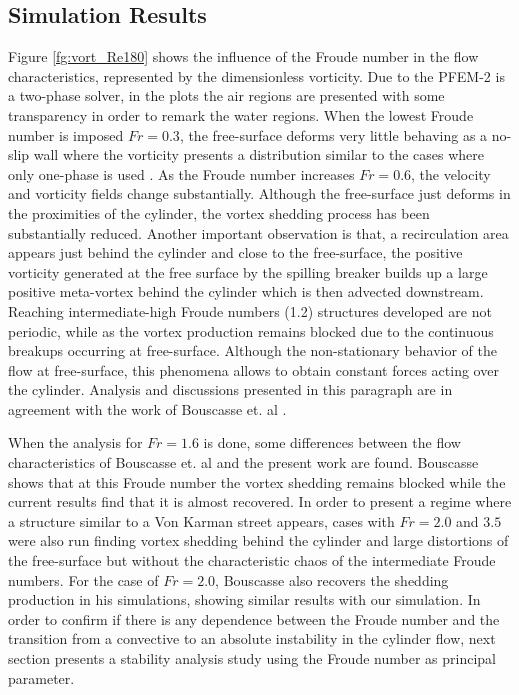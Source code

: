 \subsection{Simulation Results}

Figure \ref{fg:vort_Re180} shows the influence of the Froude number in the flow characteristics, represented by the dimensionless vorticity. Due to the PFEM-2 is a two-phase solver, in the plots the air regions are presented with some transparency in order to remark the water regions. When the lowest Froude number is imposed $Fr=0.3$, the free-surface deforms very little behaving as a no-slip wall where the vorticity presents a distribution similar to the cases where only one-phase is used \cite{PRICE2002175}. As the Froude number increases $Fr=0.6$, the velocity and vorticity fields change substantially. Although the free-surface just deforms in the proximities of the cylinder, the vortex shedding process has been substantially reduced. Another important observation is that, a recirculation area appears just behind the cylinder and close to the free-surface, the positive vorticity generated at the free surface by the spilling breaker builds up a large positive meta-vortex behind the cylinder which is then advected downstream. Reaching intermediate-high Froude numbers (1.2) structures developed are not periodic, while as the vortex production remains blocked due to the continuous breakups occurring at free-surface. Although the non-stationary behavior of the flow at free-surface, this phenomena allows to obtain constant forces acting over the cylinder. Analysis and discussions presented in this paragraph are in agreement with the work of Bouscasse et. al \cite{Bouscasse14}.

When the analysis for $Fr=1.6$ is done, some differences between the flow characteristics of Bouscasse et. al \cite{Bouscasse14} and the present work are found. Bouscasse shows that at this Froude number the vortex shedding remains blocked while the current results find that it is almost recovered. In order to present a regime where a structure similar to a Von Karman street appears, cases with $Fr=2.0$ and $3.5$ were also run finding vortex shedding behind the cylinder and large distortions of the free-surface but without the characteristic chaos of the intermediate Froude numbers. For the case of $Fr=2.0$, Bouscasse also recovers the shedding production in his simulations, showing similar results with our simulation. In order to confirm if there is any dependence between the Froude number and the transition from a convective to an absolute instability in the cylinder flow, next section presents a stability analysis study using the Froude number as principal parameter.

